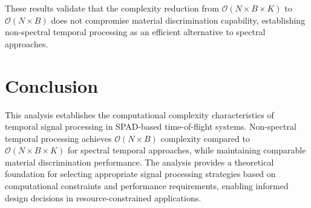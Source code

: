 \documentclass[10pt,twocolumn]{article}
\begin{document}
These results validate that the complexity reduction from $\mathcal{O}(N \times B \times K)$ to $\mathcal{O}(N \times B)$ does not compromise material discrimination capability, establishing non-spectral temporal processing as an efficient alternative to spectral approaches.

\section{Conclusion}

This analysis establishes the computational complexity characteristics of temporal signal processing in SPAD-based time-of-flight systems. Non-spectral temporal processing achieves $\mathcal{O}(N \times B)$ complexity compared to $\mathcal{O}(N \times B \times K)$ for spectral temporal approaches, while maintaining comparable material discrimination performance. The analysis provides a theoretical foundation for selecting appropriate signal processing strategies based on computational constraints and performance requirements, enabling informed design decisions in resource-constrained applications.



\end{document}
